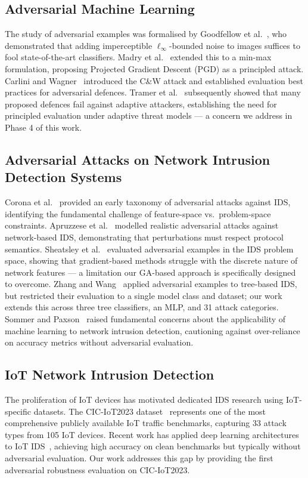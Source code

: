 \documentclass[review,12pt]{elsarticle}
\begin{document}
\subsection{Adversarial Machine Learning}
The study of adversarial examples was formalised by Goodfellow et al.~\cite{goodfellow2014explaining}, who demonstrated that adding imperceptible $\ell_\infty$-bounded noise to images suffices to fool state-of-the-art classifiers. Madry et al.~\cite{madry2018towards} extended this to a min-max formulation, proposing Projected Gradient Descent (PGD) as a principled attack. Carlini and Wagner~\cite{carlini2017evaluating} introduced the C\&W attack and established evaluation best practices for adversarial defences. Tramer et al.~\cite{tramer2020adaptive} subsequently showed that many proposed defences fail against adaptive attackers, establishing the need for principled evaluation under adaptive threat models --- a concern we address in Phase 4 of this work.

\subsection{Adversarial Attacks on Network Intrusion Detection Systems}
Corona et al.~\cite{corona2013adversarial} provided an early taxonomy of adversarial attacks against IDS, identifying the fundamental challenge of feature-space vs.\ problem-space constraints. Apruzzese et al.~\cite{apruzzese2022modeling} modelled realistic adversarial attacks against network-based IDS, demonstrating that perturbations must respect protocol semantics. Sheatsley et al.~\cite{sheatsley2022space} evaluated adversarial examples in the IDS problem space, showing that gradient-based methods struggle with the discrete nature of network features --- a limitation our GA-based approach is specifically designed to overcome. Zhang and Wang~\cite{zhang2022adversarial} applied adversarial examples to tree-based IDS, but restricted their evaluation to a single model class and dataset; our work extends this across three tree classifiers, an MLP, and 31 attack categories. Sommer and Paxson~\cite{sommer2010outside} raised fundamental concerns about the applicability of machine learning to network intrusion detection, cautioning against over-reliance on accuracy metrics without adversarial evaluation.

\subsection{IoT Network Intrusion Detection}
The proliferation of IoT devices has motivated dedicated IDS research using IoT-specific datasets. The CIC-IoT2023 dataset~\cite{neto2023ciciot2023} represents one of the most comprehensive publicly available IoT traffic benchmarks, capturing 33 attack types from 105 IoT devices. Recent work has applied deep learning architectures to IoT IDS~\cite{hassanin2023iot}, achieving high accuracy on clean benchmarks but typically without adversarial evaluation. Our work addresses this gap by providing the first adversarial robustness evaluation on CIC-IoT2023.
\end{document}
